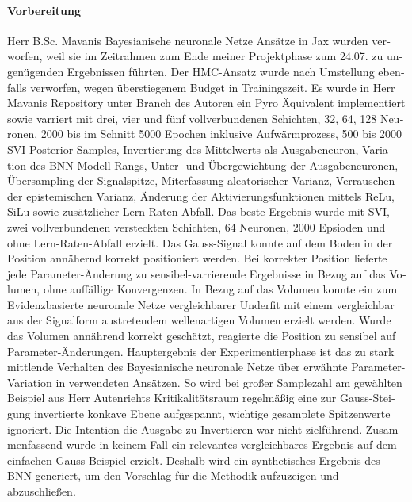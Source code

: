 \begin{otherlanguage}{ngerman}
{\paragraph{Vorbereitung} Herr B.Sc. Mavanis \gls{Bayesianische neuronale Netze} Ansätze in Jax wurden verworfen, weil sie im Zeitrahmen zum Ende meiner Projektphase zum 24.07. zu ungenügenden Ergebnissen führten. Der HMC-Ansatz wurde nach Umstellung ebenfalls verworfen, wegen überstiegenem Budget in Trainingszeit. Es wurde in Herr Mavanis Repository unter Branch des Autoren ein Pyro Äquivalent implementiert sowie varriert mit drei, vier und fünf vollverbundenen Schichten, 32, 64, 128 Neuronen, 2000 bis im Schnitt 5000 Epochen inklusive Aufwärmprozess, 500 bis 2000 SVI Posterior Samples, Invertierung des Mittelwerts als Ausgabeneuron, Variation des BNN Modell Rangs, Unter- und Übergewichtung der Ausgabeneuronen, Übersampling der Signalspitze, Miterfassung aleatorischer Varianz, Verrauschen der epistemischen Varianz, Änderung der Aktivierungsfunktionen mittels ReLu, SiLu sowie zusätzlicher Lern-Raten-Abfall. Das beste Ergebnis wurde mit SVI, zwei vollverbundenen versteckten Schichten, 64 Neuronen, 2000 Epsioden und ohne Lern-Raten-Abfall erzielt. Das Gauss-Signal konnte auf dem Boden in der Position annähernd korrekt positioniert werden. Bei korrekter Position lieferte jede Parameter-Änderung zu sensibel-varrierende Ergebnisse in Bezug auf das Volumen, ohne auffällige Konvergenzen. In Bezug auf das Volumen konnte ein zum \gls{Evidenzbasierte neuronale Netze} vergleichbarer Underfit mit einem vergleichbar aus der Signalform austretendem wellenartigen Volumen erzielt werden. Wurde das Volumen annährend korrekt geschätzt, reagierte die Position zu sensibel auf Parameter-Änderungen. Hauptergebnis der Experimentierphase ist das zu stark mittlende Verhalten des \gls{Bayesianische neuronale Netze} über erwähnte Parameter-Variation in verwendeten Ansätzen. So wird bei großer Samplezahl am gewählten Beispiel aus Herr Autenriehts Kritikalitätsraum regelmäßig eine zur Gauss-Steigung invertierte konkave Ebene aufgespannt, wichtige gesamplete Spitzenwerte ignoriert. Die Intention die Ausgabe zu Invertieren war nicht zielführend. Zusammenfassend wurde in keinem Fall ein relevantes vergleichbares Ergebnis auf dem einfachen Gauss-Beispiel erzielt. Deshalb wird ein synthetisches Ergebnis des BNN generiert, um den Vorschlag für die Methodik aufzuzeigen und abzuschließen.  



}
\end{otherlanguage}
